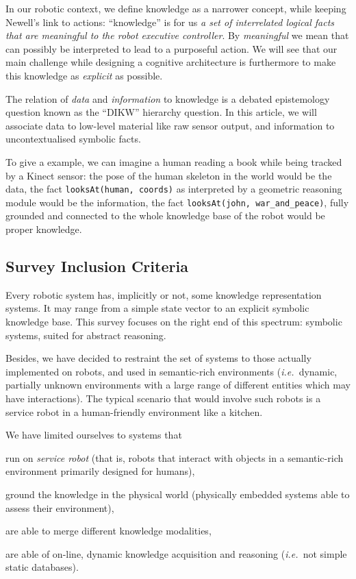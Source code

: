 \documentclass[journal]{IEEEtran}
\newcommand{\ie}{{\textit{i.e.\ }}}
\newcommand{\concept}[1]{{\footnotesize \texttt{#1}}}
\begin{document}
In our robotic context, we define knowledge as a narrower concept, while
keeping Newell's link to actions: ``knowledge'' is for us  \emph{a set of
interrelated logical facts that are meaningful to the robot executive
controller}. By \emph{meaningful} we mean that can possibly be interpreted to
lead to a purposeful action. We will see that our main challenge while
designing a cognitive architecture is furthermore to make this knowledge as
\emph{explicit} as possible.

The relation of \emph{data} and \emph{information} to knowledge is a debated
epistemology question known as the ``DIKW'' hierarchy question. In this article,
we will associate data to low-level material like raw sensor output, and
information to uncontextualised symbolic facts.

To give a example, we can imagine a human reading a book while being tracked by
a Kinect sensor: the pose of the human skeleton in the world would be the data,
the fact \concept{looksAt(human, coords)} as interpreted by a geometric reasoning
module would be the information, the fact \concept{looksAt(john,
war\_and\_peace)}, fully grounded and connected to the whole knowledge base of
the robot would be proper knowledge.

\subsection*{Survey Inclusion Criteria}
\label{sect|inclusion-criteria}

Every robotic system has, implicitly or not, some knowledge representation
systems. It may range from a simple state vector to an explicit symbolic
knowledge base.  This survey focuses on the right end of this spectrum:
symbolic systems, suited for abstract reasoning.

Besides, we have decided to restraint the set of systems to those actually
implemented on robots, and used in semantic-rich environments (\ie dynamic,
partially unknown environments with a large range of different entities which
may have interactions). The typical scenario that would involve such robots is
a service robot in a human-friendly environment like a kitchen.

We have limited ourselves to systems that
\begin{inparaenum} 
    \item  run on \emph{service robot} (that is, robots that interact with 
    objects in a semantic-rich environment primarily designed for humans),
    \item  ground the knowledge in the physical world (physically embedded
    systems able to assess their environment),
    \item  are able to merge different knowledge modalities,
    \item  are able of on-line, dynamic knowledge acquisition and reasoning 
    (\ie not simple static databases).
\end{inparaenum}
\end{document}
